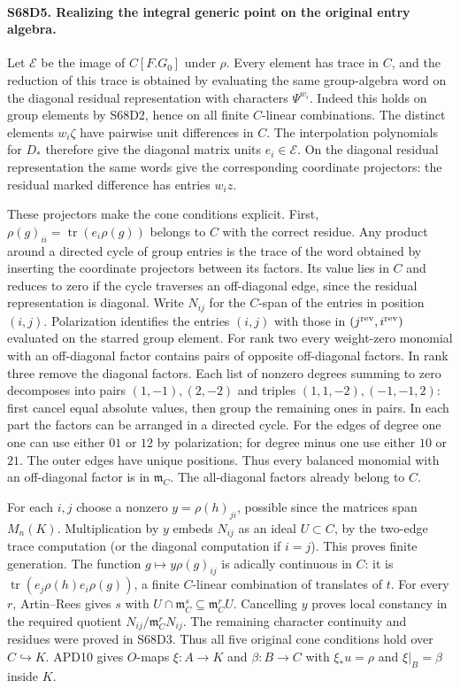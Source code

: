 \paragraph{S68D5. Realizing the integral generic point on the original entry algebra.}
Let $\mathcal E$ be the image of $C[F.G_0]$ under $\rho$.
Every element has trace in $C$, and the reduction of this trace
is obtained by evaluating the same group-algebra word on the
diagonal residual representation with characters $\Psi^{w_i}$.
Indeed this holds on group elements by S68D2, hence on all
finite $C$-linear combinations. The distinct elements $w_i\zeta$
have pairwise unit differences in $C$. The interpolation
polynomials for $D_*$ therefore give the diagonal matrix units
$e_i\in\mathcal E$. On the diagonal residual representation the
same words give the corresponding coordinate projectors:
the residual marked difference has entries $w_i z$.

These projectors make the cone conditions explicit. First,
$\rho(g)_{ii}=\operatorname{tr}(e_i\rho(g))$ belongs to $C$
with the correct residue. Any product around a directed cycle
of group entries is the trace of the word obtained by inserting
the coordinate projectors between its factors. Its value lies
in $C$ and reduces to zero if the cycle traverses an off-diagonal
edge, since the residual representation is diagonal. Write
$N_{ij}$ for the $C$-span of the entries in position $(i,j)$.
Polarization identifies the entries $(i,j)$ with those in
$(j^{\rm rev},i^{\rm rev})$ evaluated on the starred group element.
For rank two every weight-zero monomial with an off-diagonal
factor contains pairs of opposite off-diagonal factors. In rank
three remove the diagonal factors. Each list of nonzero degrees
summing to zero decomposes into pairs $(1,-1),(2,-2)$ and triples
$(1,1,-2),(-1,-1,2)$: first cancel equal absolute values, then
group the remaining ones in pairs. In each part the factors can
be arranged in a directed cycle. For the edges of degree one
one can use either $01$ or $12$ by polarization; for degree minus
one use either $10$ or $21$. The outer edges have unique positions.
Thus every balanced monomial with an off-diagonal factor is in
$\mathfrak m_C$. The all-diagonal factors already belong to $C$.

For each $i,j$ choose a nonzero $y=\rho(h)_{ji}$, possible since
the matrices span $M_n(K)$. Multiplication by $y$ embeds $N_{ij}$
as an ideal $U\subset C$, by the two-edge trace computation
(or the diagonal computation if $i=j$). This proves finite
generation. The function $g\mapsto y\rho(g)_{ij}$ is adically
continuous in $C$: it is $\operatorname{tr}(e_j\rho(h)e_i\rho(g))$,
a finite $C$-linear combination of translates of $t$. For every
$r$, Artin--Rees gives $s$ with
$U\cap\mathfrak m_C^s\subseteq\mathfrak m_C^r U$.
Cancelling $y$ proves local constancy in the required quotient
$N_{ij}/\mathfrak m_C^rN_{ij}$. The remaining character
continuity and residues were proved in S68D3.
Thus all five original cone conditions hold over $C\hookrightarrow K$.
APD10 gives $O$-maps $\xi:A\to K$ and $\beta:B\to C$ with
$\xi_*u=\rho$ and $\xi|_B=\beta$ inside $K$.

